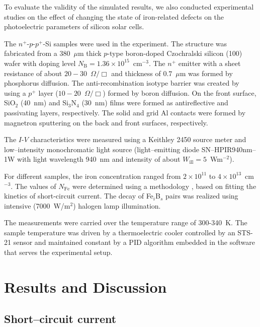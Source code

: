 \documentclass[a4paper,fleqn]{cas-sc}
\begin{document}
To evaluate the validity of the simulated results,
we also conducted experimental studies on the effect of changing the state of iron-related defects on the photoelectric parameters of silicon solar cells.

The $n^+$-$p$-$p^+$-Si samples were used in the experiment.
The structure was fabricated from a 380~$\mu$m thick $p$-type boron-doped
Czochralski silicon (100) wafer with doping level $N_\mathrm{B}=1.36\times10^{15}$~cm$^{-3}$.
The $n^+$ emitter with a sheet resistance of about $20-30$~$\Omega/\Box$
and  thickness of $0.7$~$\mu$m was formed by phosphorus diffusion.
The anti-recombination isotype barrier was created by using a $p^+$
layer ($10-20$~$\Omega/\Box$) formed by boron diffusion.
On the front surface, SiO$_2$ (40~nm) and Si$_3$N$_4$ (30~nm) films were formed as antireflective and passivating layers, respectively.
The solid and grid Al contacts were formed by magnetron sputtering on the back and front surfaces, respectively.

The $I$-$V$ characteristics were measured using a Keithley 2450 source meter and
low--intensity monochromatic light source (light--emitting diode SN--HPIR940nm--1W with light wavelength 940~nm and intensity of about  $W_\mathrm{ill} = 5$~Wm$^{-2}$).

For different samples, the iron concentration ranged from $2\times10^{11}$ to $4\times10^{13}$~cm$^{-3}$.
The values of $N_\mathrm{Fe}$ were determined using a methodology \cite{Olikh2022:JMatSci,Olikh2021JAP}, based on fitting the kinetics of short-circuit current.
The decay of Fe$_i$B$_s$ pairs was realized using intensive (7000~W/$\mathrm{m}^{2}$) halogen lamp illumination.

The measurements were carried over the temperature range of 300-340~K.
The sample temperature was driven by a thermoelectric cooler controlled by an STS-21 sensor
and maintained constant by a PID algorithm embedded in the software that serves the experimental setup.


\section{Results and Discussion}%

\subsection{Short--circuit current}
\end{document}
